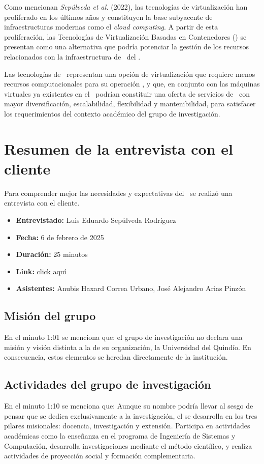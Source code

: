 Como mencionan \textit{Sepúlveda et al.} (2022), las tecnologías de virtualización han proliferado en los últimos años y constituyen la base subyacente de infraestructuras modernas como el \textit{cloud computing}. A partir de esta proliferación, las Tecnologías de Virtualización Basadas en Contenedores (\VBC) se presentan como una alternativa que podría potenciar la gestión de los recursos relacionados con la infraestructura de \TI\ del \GRID.

Las tecnologías de \VBC\ representan una opción de virtualización que requiere menos recursos computacionales para su operación \citep{Xavier2013}, y que, en conjunto con las máquinas virtuales ya existentes en el \GRID\, podrían constituir una oferta de servicios de \TI\ con mayor diversificación, escalabilidad, flexibilidad y mantenibilidad, para satisfacer los requerimientos del contexto académico del grupo de investigación.

\section{Resumen de la entrevista con el cliente}

Para comprender mejor las necesidades y expectativas del \GRID\, se realizó una entrevista con el cliente.

\begin{itemize}
  \item \textbf{Entrevistado:} Luis Eduardo Sepúlveda Rodríguez
  \item \textbf{Fecha:} 6 de febrero de 2025
  \item \textbf{Duración:} 25 minutos
  \item \textbf{Link:} \href{https://drive.google.com/file/d/1rIc9xOsyDqumlTV-QXcw0inPyIbSEHLz/view?usp=sharing}{click aquí}
  \item \textbf{Asistentes:} Anubis Haxard Correa Urbano, José Alejandro Arias Pinzón
\end{itemize}

\subsection{Misión del grupo \GRID}
En el minuto 1:01 se menciona que: el grupo de investigación no declara una misión y visión distinta a la de su organización, la Universidad del Quindío. En consecuencia, estos elementos se heredan directamente de la institución.

\subsection{Actividades del grupo de investigación}
En el minuto 1:10 se menciona que: Aunque su nombre podría llevar al sesgo de pensar que se dedica exclusivamente a la investigación, el \GRID se desarrolla en los tres pilares misionales: docencia, investigación y extensión. Participa en actividades académicas como la enseñanza en el programa de Ingeniería de Sistemas y Computación, desarrolla investigaciones mediante el método científico, y realiza actividades de proyección social y formación complementaria.

